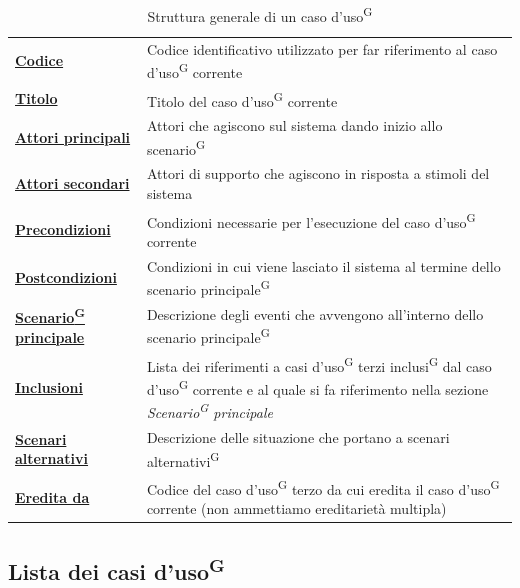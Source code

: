 \documentclass[a4paper, 11pt]{article}
\newcommand{\refterm}[1]{#1\textsuperscript{G}}
\begin{document}
\begin{table}[H]
	\centering
	\begin{tabular}{|p{.25\linewidth} p{.6\linewidth}|}
		\hline
		\textbf{\underline{Codice}}
		&
		Codice identificativo utilizzato per far riferimento al \refterm{caso d'uso} corrente\\

		\textbf{\underline{Titolo}}
		&
		Titolo del \refterm{caso d'uso} corrente\\

		\textbf{\underline{Attori principali}}
		&
		Attori che agiscono sul sistema dando inizio allo scenario\textsuperscript{G}\\

		\textbf{\underline{Attori secondari}}
		&
		Attori di supporto che agiscono in risposta a stimoli del sistema\\

		\textbf{\underline{Precondizioni}}
		&
		Condizioni necessarie per l'esecuzione del \refterm{caso d'uso} corrente\\

		\textbf{\underline{Postcondizioni}}
		&
		Condizioni in cui viene lasciato il sistema al termine dello \refterm{scenario principale}\\

		\textbf{\underline{Scenario\textsuperscript{G} principale}}
		&
		Descrizione degli eventi che avvengono all'interno dello \refterm{scenario principale}\\

		\textbf{\underline{Inclusioni}}
		&
		Lista dei riferimenti a \refterm{casi d'uso} terzi \refterm{inclusi} dal \refterm{caso d'uso} corrente e al quale si fa riferimento nella sezione \textit{Scenario\textsuperscript{G} principale}\\

		\textbf{\underline{Scenari alternativi}}
		&
		Descrizione delle situazione che portano a \refterm{scenari alternativi}\\

		\textbf{\underline{Eredita da}}
		&
		Codice del \refterm{caso d'uso} terzo da cui eredita il \refterm{caso d'uso} corrente (non ammettiamo ereditarietà multipla)\\

		\hline
	\end{tabular}
	\caption{Struttura generale di un caso d'uso\textsuperscript{G}}
\end{table}

\newpage
\subsection{Lista dei \refterm{casi d'uso}}
\end{document}
